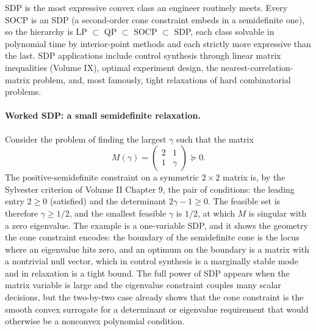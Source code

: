 SDP is the most expressive convex class an engineer routinely meets.
Every SOCP is an SDP (a second-order cone constraint embeds in a
semidefinite one), so the hierarchy is LP $\subset$ QP $\subset$ SOCP
$\subset$ SDP, each class solvable in polynomial time by interior-point
methods and each strictly more expressive than the last. SDP
applications include control synthesis through linear matrix
inequalities (Volume IX), optimal experiment design, the
nearest-correlation-matrix problem, and, most famously, tight
relaxations of hard combinatorial problems.

\paragraph{Worked SDP: a small semidefinite relaxation.}
Consider the problem of finding the largest $\gamma$ such that the
matrix
\[
M(\gamma) = \begin{pmatrix} 2 & 1 \\ 1 & \gamma \end{pmatrix}
\succeq 0.
\]
The positive-semidefinite constraint on a symmetric $2 \times 2$ matrix
is, by the Sylvester criterion of Volume II Chapter 9, the pair of
conditions: the leading entry $2 \geq 0$ (satisfied) and the
determinant $2\gamma - 1 \geq 0$. The feasible set is therefore $\gamma
\geq 1/2$, and the smallest feasible $\gamma$ is $1/2$, at which $M$ is
singular with a zero eigenvalue. The example is a one-variable SDP, and
it shows the geometry the cone constraint encodes: the boundary of the
semidefinite cone is the locus where an eigenvalue hits zero, and an
optimum on the boundary is a matrix with a nontrivial null vector,
which in control synthesis is a marginally stable mode and in
relaxation is a tight bound. The full power of SDP appears when the
matrix variable is large and the eigenvalue constraint couples many
scalar decisions, but the two-by-two case already shows that the cone
constraint is the smooth convex surrogate for a determinant or
eigenvalue requirement that would otherwise be a nonconvex polynomial
condition.

